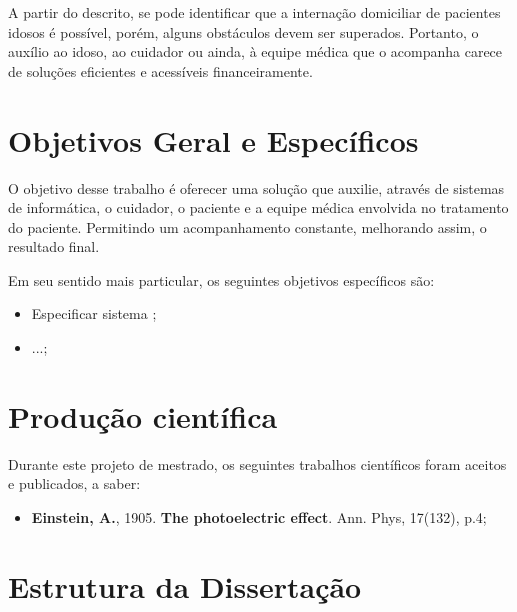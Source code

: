 A partir do descrito, se pode identificar que a internação domiciliar
de pacientes idosos é possível, porém, alguns obstáculos devem ser superados. 
Portanto, o auxílio ao idoso, ao cuidador ou ainda, à equipe médica que o 
acompanha carece de soluções eficientes e acessíveis financeiramente.

\section{Objetivos Geral e Específicos}\label{sec:objetivos}

O objetivo desse trabalho é oferecer uma solução que auxilie, através de
sistemas de informática, o cuidador, o paciente e a equipe médica envolvida
no tratamento do paciente. Permitindo um acompanhamento constante, melhorando
assim, o resultado final.

Em seu sentido mais particular, os seguintes objetivos específicos são:

\begin{itemize}
	\item Especificar sistema ; 
	\item ...;
\end{itemize}

\section{Produção científica}\label{sec:producao}
Durante este projeto de mestrado, os seguintes trabalhos científicos foram aceitos e publicados, a saber:

\begin{itemize}
	\item \textbf{Einstein, A.}, 1905. \textbf{The photoelectric effect}. Ann. Phys, 17(132), p.4;
\end{itemize}

\section{Estrutura da Dissertação}\label{sec:estrutura}
\lipsum[1]
